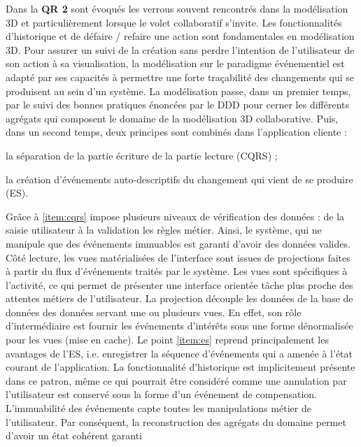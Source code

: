 Dans la \textbf{QR 2} sont évoqués les verrous souvent rencontrés dans la 
modélisation 3D et particulièrement lorsque le volet collaboratif s'invite. Les 
fonctionnalités d'historique et de défaire / refaire une action sont fondamentales en 
modélisation 3D. Pour assurer un suivi de la création sans perdre l'intention de 
l'utilisateur de son action à sa visualisation, la modélisation sur le paradigme 
événementiel est adapté par ses capacités à permettre une forte traçabilité des 
changements qui se produisent au sein d'un système. La modélisation passe, 
dans un premier temps, par le suivi des bonnes pratiques énoncées par le 
\gls{DDD} pour cerner les différents agrégats qui composent le domaine de la 
modélisation 3D collaborative. 
Puis, dans un second temps, deux principes sont combinés dans l'application 
cliente : 
\begin{enumerate*}[label=(\roman*)]
	\item \label{item:cqrs}la séparation de la partie écriture de la partie lecture 
	(\gls{CQRS}) ;
	\item \label{item:es} la création d'événements auto-descriptifs du changement 
	qui vient de se 
	produire (\gls{ES}).
\end{enumerate*}
Grâce à \ref{item:cqrs} impose plusieurs niveaux de vérification des données : de 
la saisie 
utilisateur à la validation les règles métier. Ainsi, le système, qui ne manipule que 
des événements immuables est garanti d'avoir des données valides.
Côté lecture, les vues matérialisées de l'interface sont issues de projections faites 
à partir du flux d'événements traités par le système. Les vues sont spécifiques à 
l'activité, ce qui permet de présenter une interface orientée tâche plus proche des 
attentes métiers de l'utilisateur. La projection découple les données de la base 
de données des données servant une ou plusieurs vues. En effet, son rôle 
d'intermédiaire est fournir les événements d'intérêts sous une forme dénormalisée 
pour les vues (mise en cache).
Le point \ref{item:es} reprend principalement les avantages de l'\gls{ES}, i.e. 
enregistrer la 
séquence d'événements qui a amenée à l'état courant de l'application. La 
fonctionnalité d'historique est implicitement présente dans ce patron, même ce qui 
pourrait être considéré comme une \og annulation\fg{} par l'utilisateur est conservé 
sous la forme d'un événement de compensation. L'immuabilité des événements 
capte toutes les manipulations métier de l'utilisateur. Par conséquent, la 
reconstruction des agrégats du domaine permet d'avoir un état cohérent garanti 
